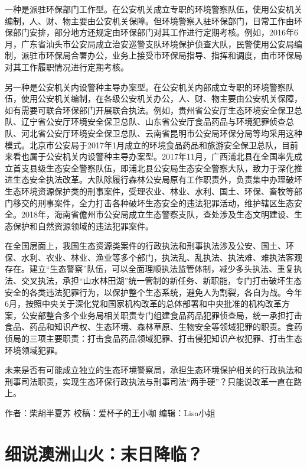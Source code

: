 \documentclass[
]{book}
\begin{document}
一种是派驻环保部门工作型。在公安机关成立专职的环境警察队伍，使用公安机关编制，人、财、物主要由公安机关保障。但环境警察入驻环保部门，日常工作由环保部门安排，部分地方还规定由环保部门对其工作进行定期考核。例如，2016年6月，广东省汕头市公安局成立治安巡警支队环境保护侦查大队，民警使用公安局编制，派驻市环保局合署办公，业务上接受市环保局指导、指挥和调度，由市环保局对其工作履职情况进行定期考核。

另一种是公安机关内设警种主导办案型。在公安机关内部成立专职的环境警察队伍，使用公安机关编制，在各级公安机关办公，人、财、物主要由公安机关保障，如有需要可联合环保部门开展联合执法。例如，贵州省公安厅生态环境安全保卫总队、辽宁省公安厅环境安全保卫总队、山东省公安厅食品药品与环境犯罪侦查总队、河北省公安厅环境安全保卫总队、云南省昆明市公安局环保分局等均采用这种模式。北京市公安局于2017年1月成立的环境食品药品和旅游安全保卫总队，目前来看也属于公安机关内设警种主导办案型。2017年11月，广西浦北县在全国率先成立首支县级生态安全警察队伍，即浦北县公安局生态安全警察大队，致力于深化推进生态安全执法改革。大队除履行森林公安局原有工作职责外，负责集中办理破坏生态环境资源保护类的刑事案件，受理农业、林业、水利、国土、环保、畜牧等部门移交的刑事案件，全力打击各种破坏生态安全的违法犯罪活动，维护辖区生态安全。2018年，海南省儋州市公安局成立生态警察支队，查处涉及生态文明建设、生态保护和自然资源领域的违法犯罪案件。

在全国层面上，我国生态资源类案件的行政执法和刑事执法涉及公安、国土、环保、水利、农业、林业、渔业等多个部门，执法乱、乱执法、执法难、难执法客观存在。建立``生态警察''队伍，可以全面理顺执法监管体制，减少多头执法、重复执法、交叉执法，承担``山水林田湖''统一管制的新任务、新职能，专门打击破坏生态安全的各类违法犯罪行为，以保护整个生态系统，避免人为割裂，各自为战。今年6月，按照中央关于深化党和国家机构改革的总体部署和中央批准的机构改革方案，公安部整合多个业务局相关职责专门组建食品药品犯罪侦查局，统一承担打击食品、药品和知识产权、生态环境、森林草原、生物安全等领域犯罪的职责。食药侦局的三项主要职责：打击食品药品领域犯罪、打击侵犯知识产权犯罪、打击生态环境领域犯罪。

未来是否有可能成立独立的生态环境警察局，承担生态环境保护相关的行政执法和刑事司法职责，实现生态环保行政执法与刑事司法``两手硬''？只能说改革一直在路上。

作者：柴胡半夏苏
校稿：爱杯子的王小咖
编辑：Lisa小姐

\hypertarget{ux7ec6ux8bf4ux6fb3ux6d32ux5c71ux706bux672bux65e5ux964dux4e34}{%
\section{细说澳洲山火：末日降临？}\label{ux7ec6ux8bf4ux6fb3ux6d32ux5c71ux706bux672bux65e5ux964dux4e34}}
\end{document}

